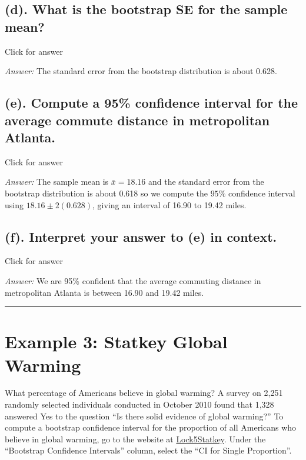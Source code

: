 \documentclass[
]{book}
\begin{document}
\hypertarget{d.-what-is-the-bootstrap-se-for-the-sample-mean}{%
\subsection{(d). What is the bootstrap SE for the sample mean?}\label{d.-what-is-the-bootstrap-se-for-the-sample-mean}}

Click for answer

\emph{Answer:} The standard error from the bootstrap distribution is about 0.628.

\hypertarget{e.-compute-a-95-confidence-interval-for-the-average-commute-distance-in-metropolitan-atlanta.}{%
\subsection{(e). Compute a 95\% confidence interval for the average commute distance in metropolitan Atlanta.}\label{e.-compute-a-95-confidence-interval-for-the-average-commute-distance-in-metropolitan-atlanta.}}

Click for answer

\emph{Answer:} The sample mean is \(\bar{x} = 18.16\) and the standard error from the bootstrap distribution is about 0.618 so we compute the \(95\%\) confidence interval using \(18.16 \pm 2(0.628)\), giving an interval of 16.90 to 19.42 miles.

\hypertarget{f.-interpret-your-answer-to-e-in-context.}{%
\subsection{(f). Interpret your answer to (e) in context.}\label{f.-interpret-your-answer-to-e-in-context.}}

Click for answer

\emph{Answer:} We are 95\% confident that the average commuting distance in metropolitan Atlanta is between 16.90 and 19.42 miles.

\begin{center}\rule{0.5\linewidth}{0.5pt}\end{center}

\hypertarget{example-3-statkey-global-warming}{%
\section{Example 3: Statkey Global Warming}\label{example-3-statkey-global-warming}}

What percentage of Americans believe in global warming? A survey on 2,251 randomly selected individuals
conducted in October 2010 found that 1,328 answered Yes to the question ``Is there solid evidence of global
warming?'' To compute a bootstrap confidence interval for the proportion of all Americans who believe in
global warming, go to the website at \href{http://www.lock5stat.com/StatKey/}{Lock5Statkey}. Under the ``Bootstrap Confidence Intervals'' column, select the ``CI for Single Proportion''.
\end{document}
